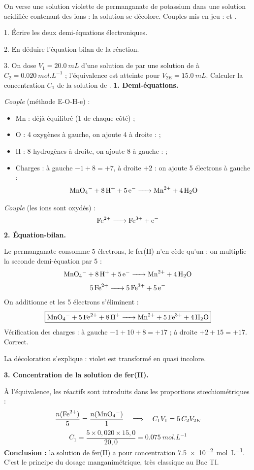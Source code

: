 \documentclass[11pt]{article}
\begin{document}
\begin{exoresolu}
On verse une solution violette de permanganate de potassium dans une solution acidifiée contenant des ions  : la solution se décolore. Couples mis en jeu :  et .\par
1. Écrire les deux demi-équations électroniques.\par
2. En déduire l'équation-bilan de la réaction.\par
3. On dose $V_1 = \SI{20,0}{mL}$ d'une solution de  par une solution de  à $C_2 = \SI{0,020}{mol.L^{-1}}$ ; l'équivalence est atteinte pour $V_{2E} = \SI{15,0}{mL}$. Calculer la concentration $C_1$ de la solution de .
\tcblower
\textbf{1. Demi-équations.}\par
\emph{Couple } (méthode E-O-H-e) :
\begin{itemize}
\item Mn : déjà équilibré (1 de chaque côté) ;
\item O : 4 oxygènes à gauche, on ajoute 4  à droite :  ;
\item H : 8 hydrogènes à droite, on ajoute 8  à gauche :  ;
\item Charges : à gauche $-1 + 8 = +7$, à droite $+2$ : on ajoute 5 électrons à gauche :
\[ \ce{MnO4^{-} + 8H+ + 5e^- -> Mn^{2+} + 4H2O} \]
\end{itemize}
\emph{Couple } (les ions  sont oxydés) :
\[ \ce{Fe^{2+} -> Fe^{3+} + e^-} \]
\textbf{2. Équation-bilan.}\par
Le permanganate consomme 5 électrons, le fer(II) n'en cède qu'un : on multiplie la seconde demi-équation par 5 :
\[ \ce{MnO4^{-} + 8H+ + 5e^- -> Mn^{2+} + 4H2O} \]
\[ \ce{5Fe^{2+} -> 5Fe^{3+} + 5e^-} \]
On additionne et les 5 électrons s'éliminent :
\[ \boxed{\ce{MnO4^{-} + 5Fe^{2+} + 8H+ -> Mn^{2+} + 5Fe^{3+} + 4H2O}} \]
Vérification des charges : à gauche $-1 + 10 + 8 = +17$ ; à droite $+2 + 15 = +17$. Correct.\par
La décoloration s'explique :  violet est transformé en  quasi incolore.\par
\textbf{3. Concentration de la solution de fer(II).}\par
À l'équivalence, les réactifs sont introduits dans les proportions stœchiométriques :
\[ \frac{n(\ce{Fe^{2+}})}{5} = \frac{n(\ce{MnO4^{-}})}{1} \quad \Longrightarrow \quad C_1 V_1 = 5\, C_2 V_{2E} \]
\[ C_1 = \frac{5 \times 0{,}020 \times 15{,}0}{20{,}0} = \boxed{\SI{0,075}{mol.L^{-1}}} \]
\textbf{Conclusion :} la solution de fer(II) a pour concentration \SI{7,5e-2}{mol.L^{-1}}. C'est le principe du dosage manganimétrique, très classique au Bac TI.
\end{exoresolu}
\end{document}
